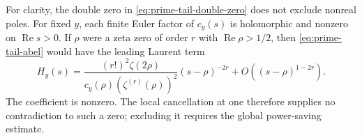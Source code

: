 For clarity, the double zero in \eqref{eq:prime-tail-double-zero}
does not exclude nonreal poles. For fixed \(y\), each finite
Euler factor of \(c_y(s)\) is holomorphic and nonzero on
\(\operatorname{Re}s>0\). If \(\rho\) were a zeta zero of
order \(r\) with \(\operatorname{Re}\rho>1/2\), then
\eqref{eq:prime-tail-abel} would have the leading Laurent term
\[
 H_y(s)=
 \frac{(r!)^2\zeta(2\rho)}
      {c_y(\rho)(\zeta^{(r)}(\rho))^2}
       (s-\rho)^{-2r}
       +O((s-\rho)^{1-2r}).
\]
The coefficient is nonzero. The local cancellation at one
therefore supplies no contradiction to such a zero; excluding
it requires the global power-saving estimate.
